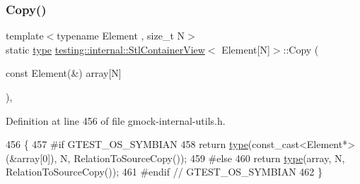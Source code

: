 \subsubsection{\texorpdfstring{Copy()}{Copy()}}
{\footnotesize\ttfamily template$<$typename Element , size\+\_\+t N$>$ \\
static \hyperlink{classtesting_1_1internal_1_1StlContainerView_3_01Element[N]_4_a364efca99cc5a02829b4e3413c506b09}{type} \hyperlink{classtesting_1_1internal_1_1StlContainerView}{testing\+::internal\+::\+Stl\+Container\+View}$<$ Element\mbox{[}N\mbox{]}$>$\+::Copy (\begin{DoxyParamCaption}\item[{const Element(\&)}]{array\mbox{[}\+N\mbox{]} }\end{DoxyParamCaption})\hspace{0.3cm}{\ttfamily [inline]}, {\ttfamily [static]}}



Definition at line 456 of file gmock-\/internal-\/utils.\+h.


\begin{DoxyCode}
456                                               \{
457 \textcolor{preprocessor}{#if GTEST\_OS\_SYMBIAN}
458     \textcolor{keywordflow}{return} \hyperlink{classtesting_1_1internal_1_1StlContainerView_3_01Element[N]_4_a364efca99cc5a02829b4e3413c506b09}{type}(const\_cast<Element*>(&array[0]), N, RelationToSourceCopy());
459 \textcolor{preprocessor}{#else}
460     \textcolor{keywordflow}{return} \hyperlink{classtesting_1_1internal_1_1StlContainerView_3_01Element[N]_4_a364efca99cc5a02829b4e3413c506b09}{type}(array, N, RelationToSourceCopy());
461 \textcolor{preprocessor}{#endif  // GTEST\_OS\_SYMBIAN}
462   \}
\end{DoxyCode}
\mbox{\label{classtesting_1_1internal_1_1StlContainerView_3_01Element[N]_4_af8c1aa62de6f8a5d3126c7b3badfefdb}} 
